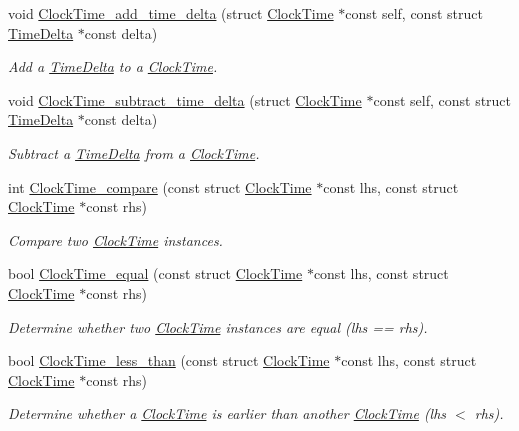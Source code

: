 \begin{DoxyCompactItemize}
void \hyperlink{clock-time_8h_adc2c863dfec0b56604b3153b226139fb}{\-Clock\-Time\-\_\-add\-\_\-time\-\_\-delta} (struct \hyperlink{structClockTime}{\-Clock\-Time} $\ast$const self, const struct \hyperlink{structTimeDelta}{\-Time\-Delta} $\ast$const delta)
\begin{DoxyCompactList}\small\item\em \-Add a \hyperlink{structTimeDelta}{\-Time\-Delta} to a \hyperlink{structClockTime}{\-Clock\-Time}. \end{DoxyCompactList}\item 
void \hyperlink{clock-time_8h_a5305df919aa0992ba4703f9b9f292a67}{\-Clock\-Time\-\_\-subtract\-\_\-time\-\_\-delta} (struct \hyperlink{structClockTime}{\-Clock\-Time} $\ast$const self, const struct \hyperlink{structTimeDelta}{\-Time\-Delta} $\ast$const delta)
\begin{DoxyCompactList}\small\item\em \-Subtract a \hyperlink{structTimeDelta}{\-Time\-Delta} from a \hyperlink{structClockTime}{\-Clock\-Time}. \end{DoxyCompactList}\item 
int \hyperlink{clock-time_8h_a769989ae3695814b6f64b17ff059d76a}{\-Clock\-Time\-\_\-compare} (const struct \hyperlink{structClockTime}{\-Clock\-Time} $\ast$const lhs, const struct \hyperlink{structClockTime}{\-Clock\-Time} $\ast$const rhs)
\begin{DoxyCompactList}\small\item\em \-Compare two \hyperlink{structClockTime}{\-Clock\-Time} instances. \end{DoxyCompactList}\item 
bool \hyperlink{clock-time_8h_a221f7f46e31399e80f81f5ec0a1517f4}{\-Clock\-Time\-\_\-equal} (const struct \hyperlink{structClockTime}{\-Clock\-Time} $\ast$const lhs, const struct \hyperlink{structClockTime}{\-Clock\-Time} $\ast$const rhs)
\begin{DoxyCompactList}\small\item\em \-Determine whether two \hyperlink{structClockTime}{\-Clock\-Time} instances are equal (lhs == rhs). \end{DoxyCompactList}\item 
bool \hyperlink{clock-time_8h_ad3add1702953b5ca410e45215ca9406b}{\-Clock\-Time\-\_\-less\-\_\-than} (const struct \hyperlink{structClockTime}{\-Clock\-Time} $\ast$const lhs, const struct \hyperlink{structClockTime}{\-Clock\-Time} $\ast$const rhs)
\begin{DoxyCompactList}\small\item\em \-Determine whether a \hyperlink{structClockTime}{\-Clock\-Time} is earlier than another \hyperlink{structClockTime}{\-Clock\-Time} (lhs $<$ rhs). \end{DoxyCompactList}\item 

\end{DoxyCompactItemize}
